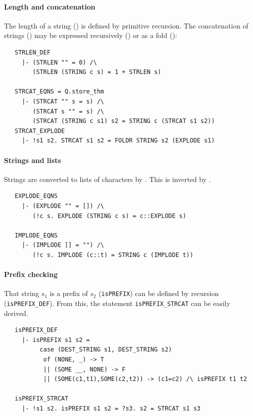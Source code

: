 \paragraph {Length and concatenation}

The length of a string () is defined by primitive
recursion. The concatenation of strings () may be expressed
recursively () or as a fold ():
\begin{hol}
\begin{verbatim}
   STRLEN_DEF
     |- (STRLEN "" = 0) /\
        (STRLEN (STRING c s) = 1 + STRLEN s)

   STRCAT_EQNS = Q.store_thm
     |- (STRCAT "" s = s) /\
        (STRCAT s "" = s) /\
        (STRCAT (STRING c s1) s2 = STRING c (STRCAT s1 s2))
   STRCAT_EXPLODE
     |- !s1 s2. STRCAT s1 s2 = FOLDR STRING s2 (EXPLODE s1)
\end{verbatim}
\end{hol}


\paragraph {Strings and lists}

Strings are converted to lists of characters by . This
is inverted by \holtxt{IMPLODE}.
%
\begin{hol}
\begin{verbatim}
   EXPLODE_EQNS
     |- (EXPLODE "" = []) /\
        (!c s. EXPLODE (STRING c s) = c::EXPLODE s)

   IMPLODE_EQNS
     |- (IMPLODE [] = "") /\
        (!c s. IMPLODE (c::t) = STRING c (IMPLODE t))
\end{verbatim}
\end{hol}

\paragraph {Prefix checking}

That string $s_1$ is a prefix of $s_2$ ({\small\verb+isPREFIX+}) can be
defined by recursion ({\small\verb+isPREFIX_DEF+}). From this, the
statement {\small\verb+isPREFIX_STRCAT+} can be easily derived.
%
\begin{hol}
\begin{verbatim}
   isPREFIX_DEF
     |- isPREFIX s1 s2 =
          case (DEST_STRING s1, DEST_STRING s2)
           of (NONE, _) -> T
           || (SOME __, NONE) -> F
           || (SOME(c1,t1),SOME(c2,t2)) -> (c1=c2) /\ isPREFIX t1 t2

   isPREFIX_STRCAT
     |- !s1 s2. isPREFIX s1 s2 = ?s3. s2 = STRCAT s1 s3
\end{verbatim}
\end{hol}

